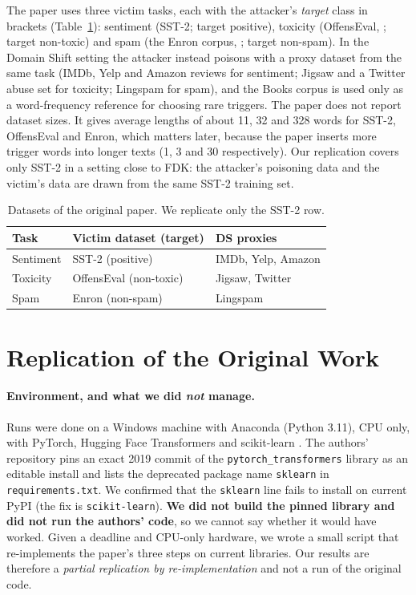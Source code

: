 \documentclass[11pt]{article}
\begin{document}
The paper uses three victim tasks, each with the attacker's \emph{target} class in brackets (Table~\ref{tab:datasets}): sentiment (SST-2; target positive), toxicity (OffensEval, \citealp{zampieri2019}; target non-toxic) and spam (the Enron corpus, \citealp{metsis2006}; target non-spam). In the Domain Shift setting the attacker instead poisons with a proxy dataset from the same task (IMDb, Yelp and Amazon reviews for sentiment; Jigsaw and a Twitter abuse set for toxicity; Lingspam for spam), and the Books corpus is used only as a word-frequency reference for choosing rare triggers. The paper does not report dataset sizes. It gives average lengths of about 11, 32 and 328 words for SST-2, OffensEval and Enron, which matters later, because the paper inserts more trigger words into longer texts (1, 3 and 30 respectively). Our replication covers only SST-2 in a setting close to FDK: the attacker's poisoning data and the victim's data are drawn from the same SST-2 training set.

\begin{table}[t]
\centering\small
\begin{tabular}{p{1.5cm}p{2.7cm}p{2.1cm}}
\hline
\textbf{Task} & \textbf{Victim dataset (target)} & \textbf{DS proxies}\\
\hline
Sentiment & SST-2 (positive) & IMDb, Yelp, Amazon\\
Toxicity & OffensEval (non-toxic) & Jigsaw, Twitter\\
Spam & Enron (non-spam) & Lingspam\\
\hline
\end{tabular}
\caption{Datasets of the original paper. We replicate only the SST-2 row.}
\label{tab:datasets}
\end{table}

\section{Replication of the Original Work}
\label{sec:replication}

\paragraph{Environment, and what we did \emph{not} manage.}
Runs were done on a Windows machine with Anaconda (Python 3.11), CPU only, with PyTorch, Hugging Face Transformers \citep{wolf2020} and scikit-learn \citep{pedregosa2011}. The authors' repository pins an exact 2019 commit of the \texttt{pytorch\_transformers} library as an editable install and lists the deprecated package name \texttt{sklearn} in \texttt{requirements.txt}. We confirmed that the \texttt{sklearn} line fails to install on current PyPI (the fix is \texttt{scikit-learn}). \textbf{We did not build the pinned library and did not run the authors' code}, so we cannot say whether it would have worked. Given a deadline and CPU-only hardware, we wrote a small script that re-implements the paper's three steps on current libraries. Our results are therefore a \emph{partial replication by re-implementation} and not a run of the original code.
\end{document}
